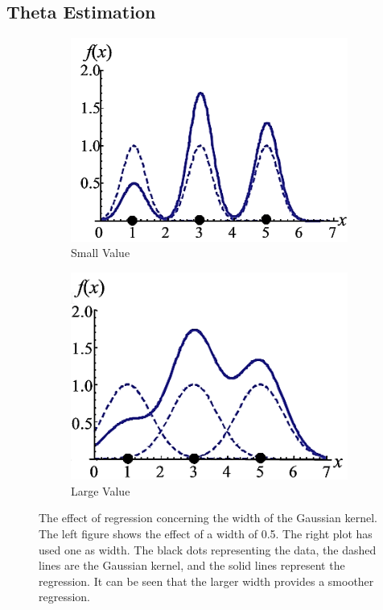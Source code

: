 \subsection{Theta Estimation}\label{InSubSecTheta}
\begin{figure}[t]
	\centering
	\begin{subfigure}{.5\textwidth}
		\centering
		\includegraphics[width=1\linewidth]{figures/GaussianWidthSmall.png}
		\caption{Small Value \label{FigSmallWidth}}
	\end{subfigure}%
	\begin{subfigure}{.5\textwidth}
		\centering
		\includegraphics[width=1\linewidth]{figures/GaussianWidthLarge.png}
		\caption{Large Value \label{FigLargeWidth}}
	\end{subfigure}
	\caption[Effect of Width in Gaussian Kernel for Regression]{The effect of regression concerning the width of the Gaussian kernel. The left figure shows the effect of a width of 0.5. The right plot has used one as width. The black dots representing the data, the dashed lines are the Gaussian kernel, and the solid lines represent the regression. It can be seen that the larger width provides a smoother regression.\cite{Kitayama.2011}}
	\label{FigGaussianWidthRegression}
\end{figure}

